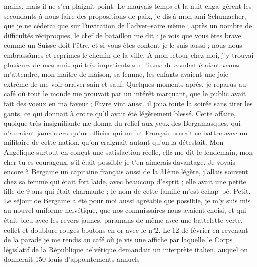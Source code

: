 \documentclass[12pt]{article}
\begin{document}
 mains, mais il ne s’en plaignit point. Le
mauvais temps et la nuit enga–gèrent les secondants à nous faire des propositions de paix, je dis à
mon ami Schumacher, que je ne céderai que sur l’invitation de l’adver–saire même ; après un nombre
de difficultés réciproques, le chef de bataillon me dit : je vois que vous êtes brave comme un
Suisse doit l’être, et si vous êtes content je le suis aussi ; nous nous embrassâmes et reprîmes le
chemin de la ville. À mon retour chez moi, j’y trouvai plusieurs de mes amis qui trè́s impatients
sur l’issue du combat étaient venus m’attendre, mon maître de maison, sa femme, les enfants avaient
une joie extrême de me voir arriver sain et sauf. Quelques moments aprés, je reparus au café où tout
le monde me prouvait par un intérêt marquant, que le public avait fait des voeux en ma faveur ;
Favre vint aussi, il joua toute la soirée sans tirer les gants, ce qui donnait à croire qu’il avait
été légèrement blessé. Cette affaire, quoique très insignifiante me donna du relief aux yeux des
Bergamasques, qui n’auraient jamais cru qu’un officier qui ne fut Français oserait se battre avec un
militaire de cette nation, qu’on craignait autant qu’on la détestait. Mon Angélique surtout en
conçut une satisfaction réelle, elle me dit le lendemain, mon cher tu es courageux, s’il était
possible je t’en aimerais davantage. Je voyais encore à Bergame un capitaine français aussi de la
31ème légère, j’allais souvent chez sa femme qui était fort laide, avec beaucoup d’esprit ; elle
avait une petite fille de 9 ans qui était charmante ; le nom de cette famille m’est échap–pé. Petit.
Le séjour de Bergame a été pour moi aussi agréable que possible, je m’y suis mis au nouvel uniforme
helvétique, que nos commissaires nous avaient choisi, et qui était bleu avec les revers jaunes,
paramans de même avec une battelette verte, collet et doublure rouges boutons en or avec le n°2. Le
12 de février en revenant de la parade je me rendis au café où je vis une affiche par laquelle le
Corps législatif de la République helvétique demandait un interprète italien, auquel on donnerait
150 louis d’appointements annuels
\end{document}
